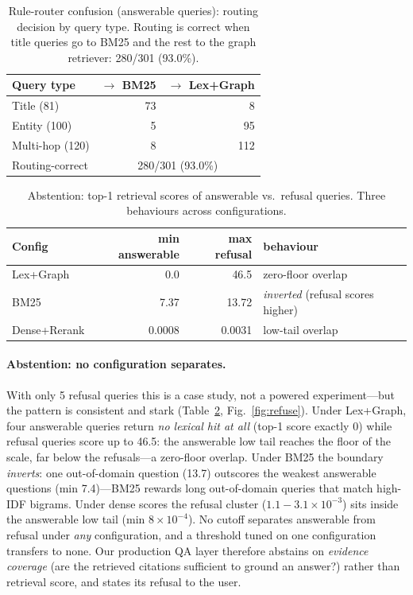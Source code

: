 \documentclass[runningheads]{llncs}
\begin{document}
\begin{table}[t]
\caption{Rule-router confusion (answerable queries): routing decision by
query type. Routing is correct when title queries go to BM25 and the rest to
the graph retriever: 280/301 (93.0\%).}
\label{tab:confusion}
\centering
\small
\begin{tabular}{lrr}
\toprule
Query type & $\to$ BM25 & $\to$ Lex+Graph \\
\midrule
Title (81) & 73 & 8 \\
Entity (100) & 5 & 95 \\
Multi-hop (120) & 8 & 112 \\
\midrule
Routing-correct & \multicolumn{2}{c}{280/301 (93.0\%)} \\
\bottomrule
\end{tabular}
\end{table}

\begin{table}[t]
\caption{Abstention: top-1 retrieval scores of answerable vs.\ refusal
queries. Three behaviours across configurations.}
\label{tab:refuse}
\centering
\small
\begin{tabular}{lrrl}
\toprule
Config & min answerable & max refusal & behaviour \\
\midrule
Lex+Graph & 0.0 & 46.5 & zero-floor overlap \\
BM25 & 7.37 & 13.72 & \emph{inverted} (refusal scores higher) \\
Dense+Rerank & 0.0008 & 0.0031 & low-tail overlap \\
\bottomrule
\end{tabular}
\end{table}

\paragraph{Abstention: no configuration separates.} With only 5 refusal
queries this is a case study, not a powered experiment---but the pattern is
consistent and stark (Table~\ref{tab:refuse}, Fig.~\ref{fig:refuse}). Under Lex+Graph, four
answerable queries return \emph{no lexical hit at all} (top-1 score exactly
0) while refusal queries score up to 46.5: the answerable low tail reaches
the floor of the scale, far below the refusals---a zero-floor overlap. Under
BM25 the boundary \emph{inverts}: one out-of-domain question (13.7)
outscores the weakest answerable questions (min 7.4)---BM25 rewards long
out-of-domain queries that match high-IDF bigrams. Under dense scores the
refusal cluster ($1.1{-}3.1{\times}10^{-3}$) sits inside the answerable
low tail (min $8{\times}10^{-4}$). No cutoff separates answerable from
refusal under \emph{any} configuration, and a threshold tuned on one
configuration transfers to none. Our production QA layer therefore abstains
on \emph{evidence coverage} (are the retrieved citations sufficient to
ground an answer?) rather than retrieval score, and states its refusal to
the user.
\end{document}

